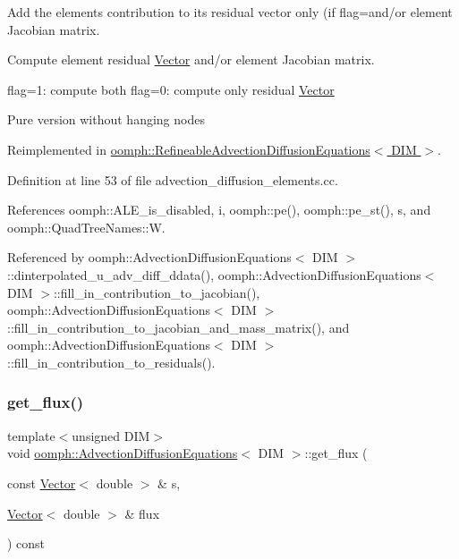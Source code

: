 Add the element\textquotesingle{}s contribution to its residual vector only (if flag=and/or element Jacobian matrix. 

Compute element residual \hyperlink{classoomph_1_1Vector}{Vector} and/or element Jacobian matrix.

flag=1\+: compute both flag=0\+: compute only residual \hyperlink{classoomph_1_1Vector}{Vector}

Pure version without hanging nodes 

Reimplemented in \hyperlink{classoomph_1_1RefineableAdvectionDiffusionEquations_aa42c5000c45380b8370565fac3990320}{oomph\+::\+Refineable\+Advection\+Diffusion\+Equations$<$ D\+I\+M $>$}.



Definition at line 53 of file advection\+\_\+diffusion\+\_\+elements.\+cc.



References oomph\+::\+A\+L\+E\+\_\+is\+\_\+disabled, i, oomph\+::pe(), oomph\+::pe\+\_\+st(), s, and oomph\+::\+Quad\+Tree\+Names\+::W.



Referenced by oomph\+::\+Advection\+Diffusion\+Equations$<$ D\+I\+M $>$\+::dinterpolated\+\_\+u\+\_\+adv\+\_\+diff\+\_\+ddata(), oomph\+::\+Advection\+Diffusion\+Equations$<$ D\+I\+M $>$\+::fill\+\_\+in\+\_\+contribution\+\_\+to\+\_\+jacobian(), oomph\+::\+Advection\+Diffusion\+Equations$<$ D\+I\+M $>$\+::fill\+\_\+in\+\_\+contribution\+\_\+to\+\_\+jacobian\+\_\+and\+\_\+mass\+\_\+matrix(), and oomph\+::\+Advection\+Diffusion\+Equations$<$ D\+I\+M $>$\+::fill\+\_\+in\+\_\+contribution\+\_\+to\+\_\+residuals().

\mbox{\label{classoomph_1_1AdvectionDiffusionEquations_a9c0fdde918adc761bb6f212cd9625e64}} 
\subsubsection{\texorpdfstring{get\+\_\+flux()}{get\_flux()}}
{\footnotesize\ttfamily template$<$unsigned D\+IM$>$ \\
void \hyperlink{classoomph_1_1AdvectionDiffusionEquations}{oomph\+::\+Advection\+Diffusion\+Equations}$<$ D\+IM $>$\+::get\+\_\+flux (\begin{DoxyParamCaption}\item[{const \hyperlink{classoomph_1_1Vector}{Vector}$<$ double $>$ \&}]{s,  }\item[{\hyperlink{classoomph_1_1Vector}{Vector}$<$ double $>$ \&}]{flux }\end{DoxyParamCaption}) const\hspace{0.3cm}{\ttfamily [inline]}}



